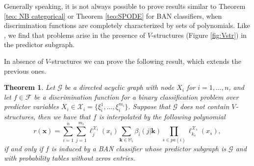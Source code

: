 \documentclass[11pt,a4paper, twoside]{book}
\newtheorem{theorem}{Theorem}[chapter]
\newcommand{\nchi}{\mathcal{X}}
\begin{document}
Generally speaking, it is not always possible to prove results similar to Theorem \ref{teo: NB categorical} or Theorem \ref{teo:SPODE} for BAN classifiers, when discrimination functions are completely characterized by sets of polynomials. Like \citet{Yang2012}, we find that problems arise in the presence of $V$-structures (Figure \ref{fig:Vstr}) in the predictor subgraph. 

In absence of $V$-structures we can prove the following result, which extends the previous ones.
\begin{theorem}
\label{teo:BAN}
Let $\mathcal{G}$ be a directed acyclic graph with node $X_i$ for $i=1,\ldots,n$, and let $f \in\mathcal{F}$ be a discrimination function {for a binary classification problem} over predictor variables $X_i \in \nchi_i=\{\xi_i^1,\ldots,\xi_i^{m_i}\}$. Suppose that $\mathcal{G}$ does not contain $V$-structures, then we have that $f$ is interpolated by the following polynomial 
\[ r(\mathbf{x})=\sum_{i=1}^{n} \sum_{j=1}^{m_i}\ell_{j}^{\nchi_i}(x_i) \sum_{\mathbf{k}\in \mathbb{M}_i} \beta_{i}(j|\mathbf{k})\prod_{s\in {pa}(i)} \ell_{k_s}^{\nchi_{s}}(x_{s}) ,\] 
if and only if $f$ is induced by a BAN classifier whose predictor subgraph is $\mathcal{G}$ { and  with probability tables without zeros entries}.
\end{theorem}
\end{document}
